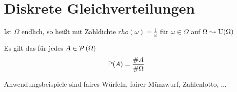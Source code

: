\section{Diskrete Gleichverteilungen}

\begin{*erinnerung}
	Ist $\Omega$ endlich, so heißt \WMass mit Zähldichte $rho(\omega) = \frac{1}{\omega}$ für $\omega \in \Omega$  auf $\Omega \leadsto \Uni(\Omega)$
\end{*erinnerung}

Es gilt das für jedes $A \in \pows\Omega$
\begin{equation*}
	\P(A) = \frac{\# A}{\# \Omega}
\end{equation*}

Anwendungsbeispiele sind faires Würfeln, fairer Münzwurf, Zahlenlotto, ...